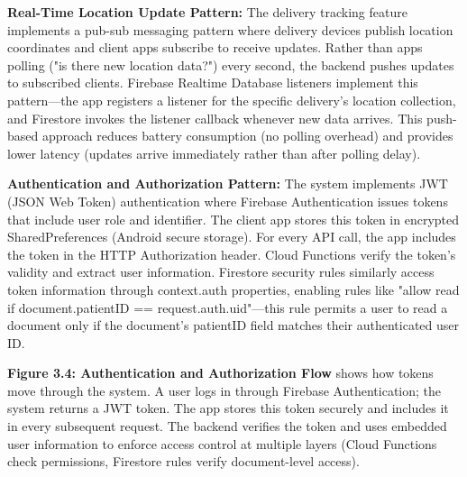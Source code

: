 \documentclass[12pt,a4paper]{report}
\begin{document}
\textbf{Real-Time Location Update Pattern:} The delivery tracking feature implements a pub-sub messaging pattern where delivery devices publish location coordinates and client apps subscribe to receive updates. Rather than apps polling ("is there new location data?") every second, the backend pushes updates to subscribed clients. Firebase Realtime Database listeners implement this pattern—the app registers a listener for the specific delivery's location collection, and Firestore invokes the listener callback whenever new data arrives. This push-based approach reduces battery consumption (no polling overhead) and provides lower latency (updates arrive immediately rather than after polling delay).

\textbf{Authentication and Authorization Pattern:} The system implements JWT (JSON Web Token) authentication where Firebase Authentication issues tokens that include user role and identifier. The client app stores this token in encrypted SharedPreferences (Android secure storage). For every API call, the app includes the token in the HTTP Authorization header. Cloud Functions verify the token's validity and extract user information. Firestore security rules similarly access token information through context.auth properties, enabling rules like "allow read if document.patientID == request.auth.uid"—this rule permits a user to read a document only if the document's patientID field matches their authenticated user ID.

\textbf{Figure 3.4: Authentication and Authorization Flow} shows how tokens move through the system. A user logs in through Firebase Authentication; the system returns a JWT token. The app stores this token securely and includes it in every subsequent request. The backend verifies the token and uses embedded user information to enforce access control at multiple layers (Cloud Functions check permissions, Firestore rules verify document-level access).
\end{document}
